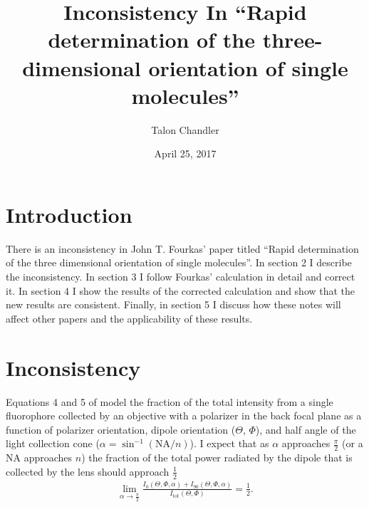 \documentclass[11pt]{article}
\begin{document}
\title{\vspace{-2.5em} Inconsistency In ``Rapid determination of the three-dimensional orientation of single molecules''\vspace{-1em}}
\author{Talon Chandler}%
\date{\vspace{-1em}April 25, 2017\vspace{-1em}}
\maketitle

\section{Introduction}
There is an inconsistency in John T. Fourkas' paper titled ``Rapid determination
of the three dimensional orientation of single molecules''\cite{fourkas}. In
section 2 I describe the inconsistency. In section 3 I follow Fourkas'
calculation in detail and correct it. In section 4 I show the results of the
corrected calculation and show that the new results are consistent. Finally, in
section 5 I discuss how these notes will affect other papers and the
applicability of these results.

\section{Inconsistency}
Equations 4 and 5 of \cite{fourkas} model the fraction of the total intensity
from a single fluorophore collected by an objective with a polarizer in the back
focal plane as a function of polarizer orientation, dipole orientation
($\Theta$, $\Phi$), and half angle of the light collection cone
($\alpha = \sin^{-1}(\text{NA}/n)$). I expect that as $\alpha$ approaches
$\frac{\pi}{2}$ (or a NA approaches $n$) the fraction of the total power
radiated by the dipole that is collected by the lens should approach
$\frac{1}{2}$
\begin{align}
  \lim_{\alpha\rightarrow \frac{\pi}{2}} \frac{I_{0}(\Theta, \Phi, \alpha) + I_{90}(\Theta, \Phi, \alpha)}{I_{\text{tot}}(\Theta, \Phi)} = \frac{1}{2}. \label{eq:prop}
\end{align}
\end{document}
